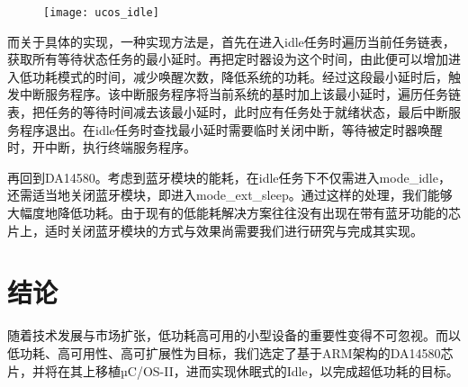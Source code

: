 \documentclass{ctexart}
\begin{document}
\begin{figure}[h]
\centering
\texttt{[image: ucos\_idle]}\par
\end{figure}
而关于具体的实现，一种实现方法是，首先在进入idle任务时遍历当前任务链表，获取所有等待状态任务的最小延时。再把定时器设为这个时间，由此便可以增加进入低功耗模式的时间，减少唤醒次数，降低系统的功耗。经过这段最小延时后，触发中断服务程序。该中断服务程序将当前系统的基时加上该最小延时，遍历任务链表，把任务的等待时间减去该最小延时，此时应有任务处于就绪状态，最后中断服务程序退出。在idle任务时查找最小延时需要临时关闭中断，等待被定时器唤醒时，开中断，执行终端服务程序。\par
再回到DA14580。考虑到蓝牙模块的能耗，在idle任务下不仅需进入mode\_idle，还需适当地关闭蓝牙模块，即进入mode\_ext\_sleep。通过这样的处理，我们能够大幅度地降低功耗。由于现有的低能耗解决方案往往没有出现在带有蓝牙功能的芯片上，适时关闭蓝牙模块的方式与效果尚需要我们进行研究与完成其实现。\par

\section{结论}

随着技术发展与市场扩张，低功耗高可用的小型设备的重要性变得不可忽视。而以低功耗、高可用性、高可扩展性为目标，我们选定了基于ARM架构的DA14580芯片，并将在其上移植µC/OS-II，进而实现休眠式的Idle，以完成超低功耗的目标。\par



\end{document}
